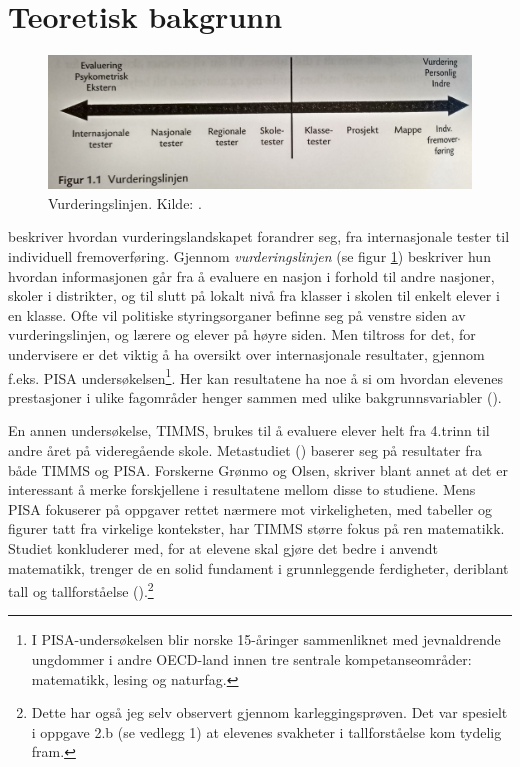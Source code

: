 \documentclass[main.tex]{subfiles}
\begin{document}
\section*{Teoretisk bakgrunn}

\begin{figure}[h!]
\centering
\includegraphics[scale = 0.1]{../figures/vurderingslinjen.png}
\caption{Vurderingslinjen. Kilde: \protect{}.}
\label{fig:smit09}
\end{figure}

 beskriver hvordan vurderingslandskapet forandrer seg, fra internasjonale tester til
individuell fremoverføring. Gjennom \emph{vurderingslinjen} (se figur \ref{fig:smit09}) beskriver hun
hvordan informasjonen går fra å evaluere en nasjon i forhold til andre nasjoner, skoler i distrikter, 
og til slutt på lokalt nivå fra klasser i skolen til enkelt elever i en klasse. Ofte vil politiske styringsorganer
befinne seg på venstre siden av vurderingslinjen, og lærere og elever på høyre siden. Men tiltross for det, 
for undervisere er det viktig å ha oversikt over internasjonale resultater, gjennom f.eks. PISA 
undersøkelsen\footnote{I  PISA-undersøkelsen blir norske 15-åringer sammenliknet med jevnaldrende ungdommer i 
andre OECD-land innen tre sentrale kompetanseområder: matematikk, lesing og naturfag.}. 
Her kan resultatene ha noe å si om hvordan elevenes prestasjoner i ulike fagområder henger sammen med ulike 
bakgrunnsvariabler (). 

En annen undersøkelse, TIMMS, brukes til å evaluere elever helt fra 4.trinn
til andre året på videregående skole. Metastudiet () baserer seg på resultater fra både TIMMS og PISA. 
Forskerne Grønmo og Olsen, skriver blant annet at det er interessant å merke forskjellene i resultatene mellom disse to 
studiene. Mens PISA fokuserer på oppgaver rettet nærmere mot virkeligheten, med tabeller og figurer tatt fra virkelige
kontekster, har TIMMS større fokus på ren matematikk. Studiet konkluderer med, for at elevene skal gjøre det bedre
i anvendt matematikk, trenger de en solid fundament i grunnleggende ferdigheter, deriblant tall og tallforståelse 
().\footnote{Dette har også jeg selv observert gjennom karleggingsprøven. Det var spesielt i oppgave 2.b (se vedlegg 1) at elevenes svakheter i tallforståelse kom tydelig fram.}
\end{document}
